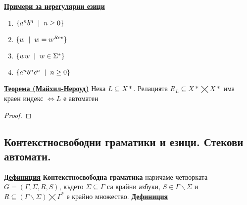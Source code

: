 \documentclass{article}
\begin{document}
\textbf{\underline{Примери за нерегулярни езици}}
\begin{enumerate}
    \item $\{a^nb^n \hspace{0.2cm} | \hspace{0.2cm} n \ge 0\}$
    \item $\{w \hspace{0.2cm} | \hspace{0.2cm} w = w^{Rev}\}$
    \item $\{ww \hspace{0.2cm} | \hspace{0.2cm} w \in \Sigma^*\}$
    \item $\{a^nb^nc^n \hspace{0.2cm} | \hspace{0.2cm} n \ge 0\}$
\end{enumerate}
\textbf{\underline{Теорема (Майхил-Нероуд)}} \newline
Нека $L \subseteq X*$. Релацията $R_L \subseteq X* \bigtimes X*$ има краен индекс $\iff L$ е автоматен 
\begin{proof}

\end{proof}
\subsection*{Контекстносвободни граматики и езици. Стекови автомати.}
\textbf{\underline{Дефиниция}}
\textbf{Контекстносвободна граматика} наричаме четворката $G = (\Gamma, \Sigma, R, S)$, където $\Sigma \subseteq \Gamma$ са
крайни азбуки, $S \in \Gamma \backslash \Sigma$ и $R \subseteq (\Gamma \backslash \Sigma) \bigtimes \Gamma^*$ е крайно множество.
\newline\newline
\textbf{\underline{Дефиниция}}
\end{document}
